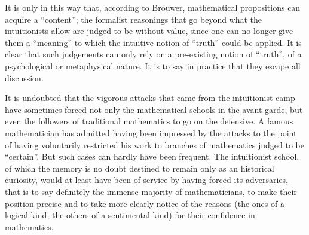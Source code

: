 It is only in this way that, according to Brouwer, mathematical propositions can acquire a ``content''; the formalist reasonings that go beyond what the intuitionists allow are judged to be without value, since one can no longer give them a ``meaning'' to which the intuitive notion of ``truth'' could be applied. It is clear that such judgements can only rely on a pre-existing notion of ``truth'', of a psychological or metaphysical nature. It is to say in practice that they escape all discussion.

It is undoubted that the vigorous attacks that came from the intuitionist camp have sometimes forced not only the mathematical schools in the avant-garde, but even the followers of traditional mathematics to go on the defensive. A famous mathematician has admitted having been impressed by the attacks to the point of having voluntarily restricted his work to branches of mathematics judged to be ``certain''. But such cases can hardly have been frequent. The intuitionist school, of which the memory is no doubt destined to remain only as an historical curiosity, would at least have been of service by having forced its adversaries, that is to say definitely the immense majority of mathematicians, to make their position precise and to take more clearly notice of the reasons (the ones of a logical kind, the others of a sentimental kind) for their confidence in mathematics.

